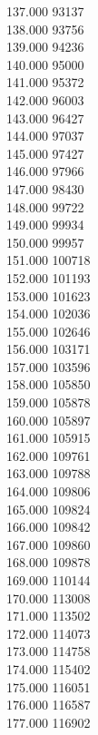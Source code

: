 { 137.000	93137 \\
 138.000	93756 \\
 139.000	94236 \\
 140.000	95000 \\
 141.000	95372 \\
 142.000	96003 \\
 143.000	96427 \\
 144.000	97037 \\
 145.000	97427 \\
 146.000	97966 \\
 147.000	98430 \\
 148.000	99722 \\
 149.000	99934 \\
 150.000	99957 \\
 151.000	100718 \\
 152.000	101193 \\
 153.000	101623 \\
 154.000	102036 \\
 155.000	102646 \\
 156.000	103171 \\
 157.000	103596 \\
 158.000	105850 \\
 159.000	105878 \\
 160.000	105897 \\
 161.000	105915 \\
 162.000	109761 \\
 163.000	109788 \\
 164.000	109806 \\
 165.000	109824 \\
 166.000	109842 \\
 167.000	109860 \\
 168.000	109878 \\
 169.000	110144 \\
 170.000	113008 \\
 171.000	113502 \\
 172.000	114073 \\
 173.000	114758 \\
 174.000	115402 \\
 175.000	116051 \\
 176.000	116587 \\
 177.000	116902 \\
}
